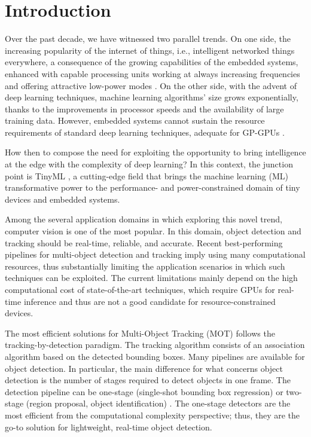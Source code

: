 \section{Introduction}
Over the past decade, we have witnessed two parallel trends. On one side, the increasing popularity of the internet of things, i.e., intelligent networked things everywhere, a consequence of the growing capabilities of the embedded systems, enhanced with capable processing units working at always increasing frequencies and offering attractive low-power modes \cite{cortex-m, raspberry, friendlyelec}. 
On the other side, with the advent of deep learning techniques, machine learning algorithms' size grows exponentially, thanks to the improvements in processor speeds and the availability of large training data. However, %
embedded systems cannot sustain the resource requirements of standard deep learning techniques, adequate for GP-GPUs \cite{Cerutti2019, Rusci2018, hao2021enabling}.

How then to compose the need for exploiting the opportunity to bring intelligence at the edge with the complexity of deep learning?
In this context, the junction point is TinyML \cite{wang2020convergence, xu2020edge}, a cutting-edge field that brings the machine learning (ML) transformative power to the performance- and power-constrained domain of tiny devices and embedded systems.

Among the several application domains in which exploring this novel trend, computer vision is one of the most popular. In this domain, object detection and tracking should be real-time, reliable, and accurate. Recent best-performing pipelines for multi-object detection and tracking imply using many computational resources, thus substantially limiting the application scenarios in which such techniques can be exploited. The current limitations mainly depend on the high computational cost of state-of-the-art techniques, which require GPUs for real-time inference and thus are not a good candidate for resource-constrained devices.

The most efficient solutions for Multi-Object Tracking (MOT) follows the tracking-by-detection paradigm. The tracking algorithm consists of an association algorithm based on the detected bounding boxes. Many pipelines are available for object detection. In particular, the main difference for what concerns object detection is the number of stages required to detect objects in one frame. The detection pipeline can be one-stage (single-shot bounding box regression) \cite{bochkovskiy2020yolov4, liu2016ssd} or two-stage (region proposal, object identification) \cite{he2017mask, ren2015faster}. The one-stage detectors are the most efficient from the computational complexity perspective; thus, they are the go-to solution for lightweight, real-time object detection.

